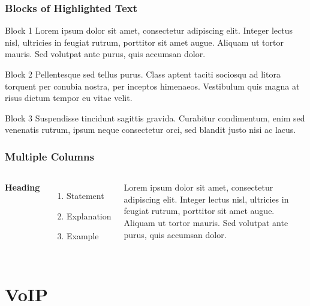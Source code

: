 \documentclass{beamer}
\begin{document}

\begin{frame}
\frametitle{Blocks of Highlighted Text}
\begin{block}{Block 1}
Lorem ipsum dolor sit amet, consectetur adipiscing elit. Integer lectus nisl, ultricies in feugiat rutrum, porttitor sit amet augue. Aliquam ut tortor mauris. Sed volutpat ante purus, quis accumsan dolor.
\end{block}

\begin{block}{Block 2}
Pellentesque sed tellus purus. Class aptent taciti sociosqu ad litora torquent per conubia nostra, per inceptos himenaeos. Vestibulum quis magna at risus dictum tempor eu vitae velit.
\end{block}

\begin{block}{Block 3}
Suspendisse tincidunt sagittis gravida. Curabitur condimentum, enim sed venenatis rutrum, ipsum neque consectetur orci, sed blandit justo nisi ac lacus.
\end{block}
\end{frame}


\begin{frame}
\frametitle{Multiple Columns}
\begin{columns}[c] %

\textbf{Heading}
\begin{enumerate}
\item Statement
\item Explanation
\item Example
\end{enumerate}

Lorem ipsum dolor sit amet, consectetur adipiscing elit. Integer lectus nisl, ultricies in feugiat rutrum, porttitor sit amet augue. Aliquam ut tortor mauris. Sed volutpat ante purus, quis accumsan dolor.

\end{columns}
\end{frame}

\section{VoIP}
\end{document}
